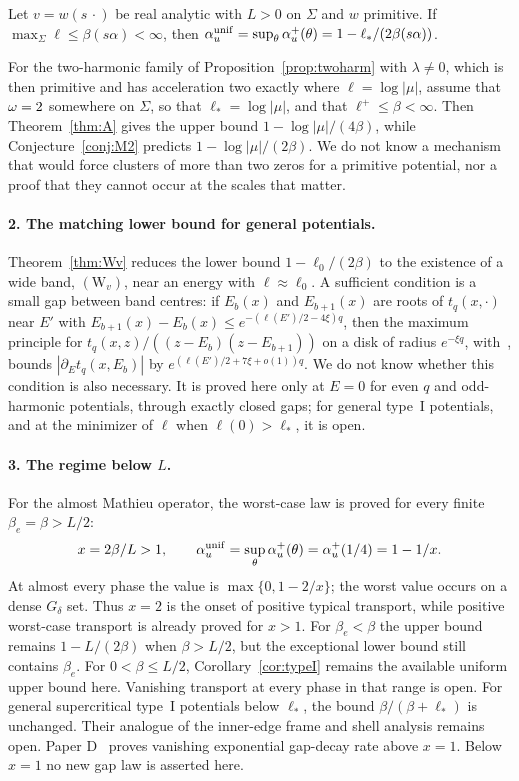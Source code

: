 \begin{conjecture}\label{conj:M2}
Let $v=w(s\,\cdot)$ be real analytic with $L>0$ on $\Sigma$ and $w$ primitive. If $\max_\Sigma\ell\le\beta(s\alpha)<\infty$, then $\alpha_u^{\mathrm{unif}}=\sup_\theta\alpha_u^+(\theta)=1-\ell_*/(2\beta(s\alpha))$.
\end{conjecture}

For the two-harmonic family of Proposition~\ref{prop:twoharm} with $\lambda\ne0$, which is then primitive and has acceleration two exactly where $\ell=\log|\mu|$, assume that $\omega=2$ somewhere on $\Sigma$, so that $\ell_*=\log|\mu|$, and that $\ell^+\le\beta<\infty$. Then Theorem~\ref{thm:A} gives the upper bound $1-\log|\mu|/(4\beta)$, while Conjecture~\ref{conj:M2} predicts $1-\log|\mu|/(2\beta)$. We do not know a mechanism that would force clusters of more than two zeros for a primitive potential, nor a proof that they cannot occur at the scales that matter.



\paragraph{2. The matching lower bound for general potentials.} Theorem~\ref{thm:Wv} reduces the lower bound $1-\ell_0/(2\beta)$ to the existence of a wide band, $(\mathrm W_v)$, near an energy with $\ell\approx\ell_0$. A sufficient condition is a small gap between band centres: if $E_b(x)$ and $E_{b+1}(x)$ are roots of $t_q(x,\cdot)$ near $E'$ with $E_{b+1}(x)-E_b(x)\le e^{-(\ell(E')/2-4\xi)q}$, then the maximum principle for $t_q(x,z)/((z-E_b)(z-E_{b+1}))$ on a disk of radius $e^{-\xi q}$, with~\cite[Corollary~5.6]{DMuniv}, bounds $|\partial_Et_q(x,E_b)|$ by $e^{(\ell(E')/2+7\xi+o(1))q}$. We do not know whether this condition is also necessary. It is proved here only at $E=0$ for even $q$ and odd-harmonic potentials, through exactly closed gaps; for general type~I potentials, and at the minimizer of $\ell$ when $\ell(0)>\ell_*$, it is open.

\paragraph{3. The regime below $L$.} For the almost Mathieu operator, the worst-case law is proved for every finite $\beta_e=\beta>L/2$:
\[
 x=2\beta/L>1,\qquad \alpha_u^{\mathrm{unif}}=\sup_\theta\alpha_u^+(\theta)=\alpha_u^+(1/4)=1-1/x.
\]
At almost every phase the value is $\max\{0,1-2/x\}$; the worst value occurs on a dense $G_\delta$ set. Thus $x=2$ is the onset of positive typical transport, while positive worst-case transport is already proved for $x>1$. For $\beta_e<\beta$ the upper bound remains $1-L/(2\beta)$ when $\beta>L/2$, but the exceptional lower bound still contains $\beta_e$.
For $0<\beta\le L/2$, Corollary~\ref{cor:typeI} remains the available uniform upper bound here. Vanishing transport at every phase in that range is open. For general supercritical type~I potentials below $\ell_*$, the bound $\beta/(\beta+\ell_*)$ is unchanged. Their analogue of the inner-edge frame and shell analysis remains open.
Paper D~\cite{DMband} proves vanishing exponential gap-decay rate above $x=1$. Below $x=1$ no new gap law is asserted here.

